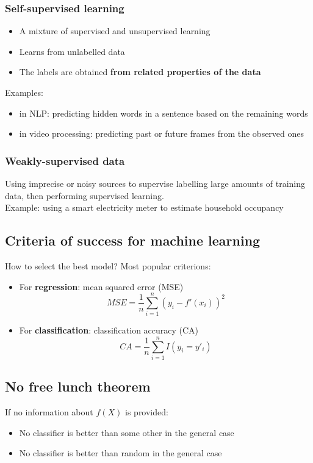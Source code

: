 \documentclass{article}
\begin{document}
        \subsubsection{Self-supervised learning}
        \begin{itemize}
            \item A mixture of supervised and unsupervised learning
            \item Learns from unlabelled data
            \item The labels are obtained \textbf{from related properties of the data}
        \end{itemize}

        Examples: 
        \begin{itemize}
            \item in NLP: predicting hidden words in a sentence based on the remaining words
            \item in video processing: predicting past or future frames from the observed ones
        \end{itemize}

        \subsubsection{Weakly-supervised data}
        Using imprecise or noisy sources to supervise labelling large amounts of training data, then performing supervised learning. \\
        Example: using a smart electricity meter to estimate household occupancy
    
    \subsection{Criteria of success for machine learning}
    How to select the best model? Most popular criterions:
    \begin{itemize}
        \item For \textbf{regression}: mean squared error (MSE)
        \[
            MSE = \frac{1}{n} \sum_{i=1}^{n} {(y_i - f'(x_i))}^2
        \]
        \item For \textbf{classification}: classification accuracy (CA)
        \[
            CA = \frac{1}{n} \sum_{i=1}^{n} I(y_i = y'_i)
        \]
    \end{itemize}

    \subsection{No free lunch theorem}
    If no information about $f(X)$ is provided:
    \begin{itemize}
        \item No classifier is better than some other in the general case
        \item No classifier is better than random in the general case
    \end{itemize}
\end{document}
